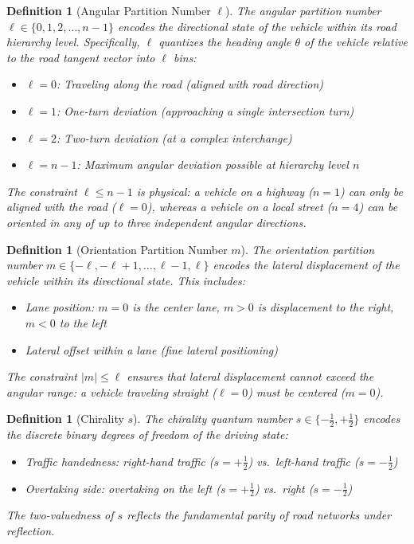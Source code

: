 \documentclass[twocolumn,10pt]{article}
\newtheorem{definition}[theorem]{Definition}
\begin{document}
\begin{definition}[Angular Partition Number $\ell$]\label{def:ell}
The angular partition number $\ell \in \{0, 1, 2, \ldots, n-1\}$ encodes the directional state of the vehicle within its road hierarchy level. Specifically, $\ell$ quantizes the heading angle $\theta$ of the vehicle relative to the road tangent vector into $\ell$ bins:
\begin{itemize}
    \item $\ell = 0$: Traveling along the road (aligned with road direction)
    \item $\ell = 1$: One-turn deviation (approaching a single intersection turn)
    \item $\ell = 2$: Two-turn deviation (at a complex interchange)
    \item $\ell = n-1$: Maximum angular deviation possible at hierarchy level $n$
\end{itemize}
The constraint $\ell \leq n-1$ is physical: a vehicle on a highway ($n=1$) can only be aligned with the road ($\ell = 0$), whereas a vehicle on a local street ($n = 4$) can be oriented in any of up to three independent angular directions.
\end{definition}

\begin{definition}[Orientation Partition Number $m$]\label{def:m}
The orientation partition number $m \in \{-\ell, -\ell+1, \ldots, \ell-1, \ell\}$ encodes the lateral displacement of the vehicle within its directional state. This includes:
\begin{itemize}
    \item Lane position: $m = 0$ is the center lane, $m > 0$ is displacement to the right, $m < 0$ to the left
    \item Lateral offset within a lane (fine lateral positioning)
\end{itemize}
The constraint $|m| \leq \ell$ ensures that lateral displacement cannot exceed the angular range: a vehicle traveling straight ($\ell = 0$) must be centered ($m = 0$).
\end{definition}

\begin{definition}[Chirality $s$]\label{def:chirality}
The chirality quantum number $s \in \{-\tfrac{1}{2}, +\tfrac{1}{2}\}$ encodes the discrete binary degrees of freedom of the driving state:
\begin{itemize}
    \item Traffic handedness: right-hand traffic ($s = +\frac{1}{2}$) vs.\ left-hand traffic ($s = -\frac{1}{2}$)
    \item Overtaking side: overtaking on the left ($s = +\frac{1}{2}$) vs.\ right ($s = -\frac{1}{2}$)
\end{itemize}
The two-valuedness of $s$ reflects the fundamental parity of road networks under reflection.
\end{definition}
\end{document}
